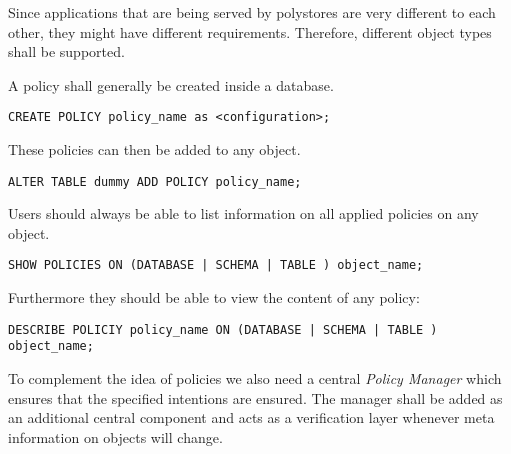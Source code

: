 
Since applications that are being served by polystores are very different to each other, they might have different requirements. 
Therefore, different object types shall be supported.

A policy shall generally be created inside a database.
\begin{verbatim}
CREATE POLICY policy_name as <configuration>;
\end{verbatim}

These policies can then be added to any object.
\begin{verbatim}
ALTER TABLE dummy ADD POLICY policy_name;
\end{verbatim}

Users should always be able to list information on all applied policies on any object.
\begin{verbatim}
SHOW POLICIES ON (DATABASE | SCHEMA | TABLE ) object_name;
\end{verbatim}


Furthermore they should be able to view the content of any policy: 
\begin{verbatim}
DESCRIBE POLICIY policy_name ON (DATABASE | SCHEMA | TABLE ) object_name; 
\end{verbatim}

To complement the idea of policies we also need a central \emph{Policy Manager} which ensures that the specified intentions are ensured.
The manager shall be added as an additional central component and acts as a verification layer whenever meta information on objects will change.

